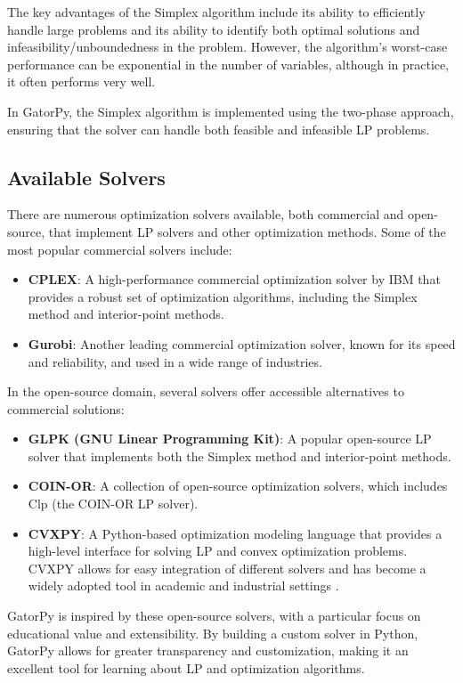 \documentclass[conference]{IEEEtran}
\begin{document}
The key advantages of the Simplex algorithm include its ability to efficiently handle large problems and its ability to identify both optimal solutions and infeasibility/unboundedness in the problem. However, the algorithm's worst-case performance can be exponential in the number of variables, although in practice, it often performs very well.

In GatorPy, the Simplex algorithm is implemented using the two-phase approach, ensuring that the solver can handle both feasible and infeasible LP problems.

\subsection{Available Solvers}

There are numerous optimization solvers available, both commercial and open-source, that implement LP solvers and other optimization methods. Some of the most popular commercial solvers include:
\begin{itemize}
    \item \textbf{CPLEX}: A high-performance commercial optimization solver by IBM that provides a robust set of optimization algorithms, including the Simplex method and interior-point methods.
    \item \textbf{Gurobi}: Another leading commercial optimization solver, known for its speed and reliability, and used in a wide range of industries.
\end{itemize}

In the open-source domain, several solvers offer accessible alternatives to commercial solutions:
\begin{itemize}
    \item \textbf{GLPK (GNU Linear Programming Kit)}: A popular open-source LP solver that implements both the Simplex method and interior-point methods.
    \item \textbf{COIN-OR}: A collection of open-source optimization solvers, which includes Clp (the COIN-OR LP solver).
    \item \textbf{CVXPY}: A Python-based optimization modeling language that provides a high-level interface for solving LP and convex optimization problems. CVXPY allows for easy integration of different solvers and has become a widely adopted tool in academic and industrial settings \cite{solvers:diamond2016cvxpy}.
\end{itemize}

GatorPy is inspired by these open-source solvers, with a particular focus on educational value and extensibility. By building a custom solver in Python, GatorPy allows for greater transparency and customization, making it an excellent tool for learning about LP and optimization algorithms.
\end{document}
